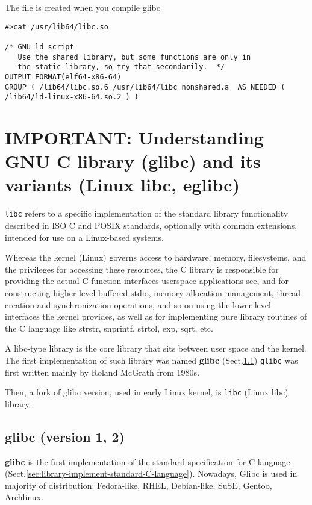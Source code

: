 The file is created when you compile glibc 
\begin{verbatim}
#>cat /usr/lib64/libc.so
 
/* GNU ld script
   Use the shared library, but some functions are only in
   the static library, so try that secondarily.  */
OUTPUT_FORMAT(elf64-x86-64)
GROUP ( /lib64/libc.so.6 /usr/lib64/libc_nonshared.a  AS_NEEDED ( /lib64/ld-linux-x86-64.so.2 ) )
\end{verbatim}



\section{IMPORTANT: Understanding GNU C library (glibc) and its variants
(Linux libc, eglibc)}
\label{sec:POSIX-C-library}
\label{sec:library-implement-standard-C-language}

\verb!libc! refers to a specific implementation of the standard library
functionality described in ISO C and POSIX standards, optionally with common
extensions, intended for use on a Linux-based systems.

Whereas the kernel (Linux) governs access to hardware, memory, filesystems, and
the privileges for accessing these resources, the C library is responsible for
providing the actual C function interfaces userspace applications see, and for
constructing higher-level buffered stdio, memory allocation management, thread
creation and synchronization operations, and so on using the lower-level
interfaces the kernel provides, as well as for implementing pure library
routines of the C language like strstr, snprintf, strtol, exp, sqrt, etc.

A libc-type library is the core library that sits between user space and the
kernel. The first implementation of such library was named {\bf glibc}
(Sect.\ref{sec:glibc}) \verb!glibc! was first written mainly by Roland McGrath
from 1980s.

Then, a fork of glibc version, used in early Linux kernel, is \verb!libc!
(Linux libc) library.

\subsection{glibc (version 1, 2)}
\label{sec:glibc}
\label{sec:GLIBC}

{\bf glibc} is the first implementation of the standard specification for C
language (Sect.\ref{sec:library-implement-standard-C-language}).
Nowadays, Glibc is used in majority of distribution: Fedora-like, RHEL,
Debian-like, SuSE, Gentoo, Archlinux.

